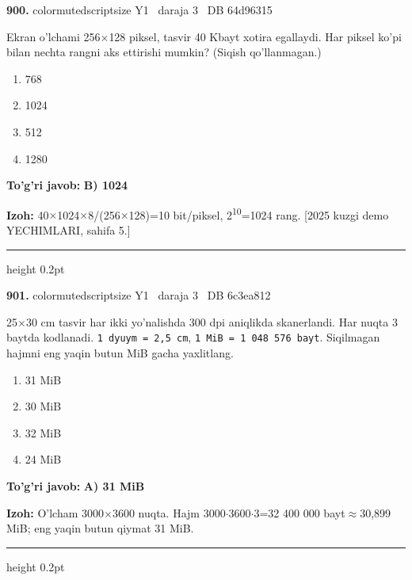 \documentclass[10pt,a4paper,oneside]{article}
\begin{document}
\noindent\textbf{\color{ink}900.}  {color{muted}scriptsize Y1 \textbullet\ daraja 3 \textbullet\ DB 64d96315}
\par
Ekran o'lchami 256\ensuremath{\times}128 piksel, tasvir 40 Kbayt xotira egallaydi. Har piksel ko'pi bilan nechta rangni aks ettirishi mumkin? (Siqish qo'llanmagan.)
\begin{enumerate}[label=\Alph*),leftmargin=9mm]
\item 768
\item 1024
\item 512
\item 1280
\end{enumerate}
\begin{tcolorbox}[enhanced,breakable,colback=teal!4,colframe=teal!50!black,boxrule=0.5pt,arc=1.1mm,left=3mm,right=3mm,top=1.7mm,bottom=1.7mm,before skip=2mm,after skip=2mm]
\textbf{\color{teal}To'g'ri javob:} \textbf{B) 1024}
\par\smallskip
\textbf{Izoh:} 40\ensuremath{\times}1024\ensuremath{\times}8/(256\ensuremath{\times}128)=10 bit/piksel, 2\textsuperscript{1}\textsuperscript{0}=1024 rang. [2025 kuzgi demo YECHIMLARI, sahifa 5.]
\end{tcolorbox}
\vspace{2mm}\hrule height 0.2pt \vspace{3mm}

\noindent\textbf{\color{ink}901.}  {color{muted}scriptsize Y1 \textbullet\ daraja 3 \textbullet\ DB 6c3ea812}
\par
25\ensuremath{\times}30 cm tasvir har ikki yo'nalishda 300 dpi aniqlikda skanerlandi. Har nuqta 3 baytda kodlanadi. \texttt{1 dyuym = 2,5 cm}, \texttt{1 MiB = 1 048 576 bayt}. Siqilmagan hajmni eng yaqin butun MiB gacha yaxlitlang.
\begin{enumerate}[label=\Alph*),leftmargin=9mm]
\item 31 MiB
\item 30 MiB
\item 32 MiB
\item 24 MiB
\end{enumerate}
\begin{tcolorbox}[enhanced,breakable,colback=teal!4,colframe=teal!50!black,boxrule=0.5pt,arc=1.1mm,left=3mm,right=3mm,top=1.7mm,bottom=1.7mm,before skip=2mm,after skip=2mm]
\textbf{\color{teal}To'g'ri javob:} \textbf{A) 31 MiB}
\par\smallskip
\textbf{Izoh:} O'lcham 3000\ensuremath{\times}3600 nuqta. Hajm 3000\ensuremath{\cdot}3600\ensuremath{\cdot}3=32 400 000 bayt\ensuremath{\approx}30,899 MiB; eng yaqin butun qiymat 31 MiB.
\end{tcolorbox}
\vspace{2mm}\hrule height 0.2pt \vspace{3mm}
\end{document}
